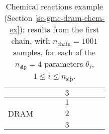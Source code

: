 \begin{table}[h!]
\begin{center}
\begin{tabular}{|c|c|c|c|c|c|c|c|c|}
\cline{5-9}
       &          &                        &                        & $3$ &                          &                                &                        &                               \\
\hline
\hline
       &          &                        &                        & $1$ &                          &                                &                        &                               \\
\cline{5-9}
DRAM   &          &                        &                        & $2$ &                          &                                &                        &                               \\
\cline{5-9}
       &          &                        &                        & $3$ &                          &                                &                        &                               \\
\hline
\end{tabular}
\caption{Chemical reactions example (Section \ref{sc-gmc-dram-chem-ex}):
results from the first chain, with $n_{\text{chain}}=1001$ samples,
for each of the $n_{\text{sip}}=4$ parameters $\theta_i$, $1\leqslant i\leqslant n_{\text{sip}}$.
}
\label{tab-dram-chem-ex-results-1}
\end{center}
\end{table}

